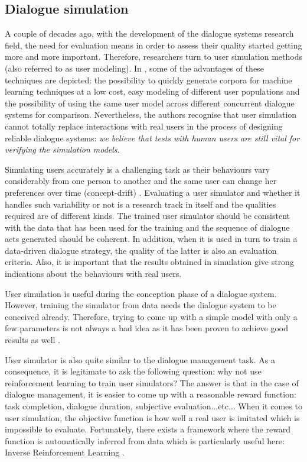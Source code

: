 	
	\subsection{Dialogue simulation}
	
		A couple of decades ago, with the development of the dialogue systems research field, the need for evaluation means in order to assess their quality started getting more and more important. Therefore, researchers turn to user simulation methods (also referred to as user modeling). In \cite{Eckert1997}, some of the advantages of these techniques are depicted: the possibility to quickly generate corpora for machine learning techniques at a low cost, easy modeling of different user populations and the possibility of using the same user model across different concurrent dialogue systems for comparison. Nevertheless, the authors recognise that user simulation cannot totally replace interactions with real users in the process of designing reliable dialogue systems: \textit{we believe that tests with human users are still vital for verifying the simulation models}.
			
			Simulating users accurately is a challenging task as their behaviours vary considerably from one person to another and the same user can change her preferences over time (concept-drift) \cite{Schatzmann2006}. Evaluating a user simulator and whether it handles such variability or not is a research track in itself \cite{Pietquin2013} and the qualities required are of different kinds. The trained user simulator should be consistent with the data that has been used for the training and the sequence of dialogue acts generated should be coherent. In addition, when it is used in turn to train a data-driven dialogue strategy, the quality of the latter is also an evaluation criteria. Also, it is important that the results obtained in simulation give strong indications about the behaviours with real users.
			
			User simulation is useful during the conception phase of a dialogue system. However, training the simulator from data needs the dialogue system to be conceived already. Therefore, trying to come up with a simple model with only a few parameters is not always a bad idea as it has been proven to achieve good results as well \cite{Schatzmann2007}.
			
			User simulator is also quite similar to the dialogue management task. As a consequence, it is legitimate to ask the following question: why not use reinforcement learning to train user simulators? The answer is that in the case of dialogue management, it is easier to come up with a reasonable reward function: task completion, dialogue duration, subjective evaluation...etc... When it comes to user simulation, the objective function is how well a real user is imitated which is impossible to evaluate. Fortunately, there exists a framework where the reward function is automatically inferred from data which is particularly useful here: Inverse Reinforcement Learning \cite{Chandramohan2011,El-Asri2012}.
			
